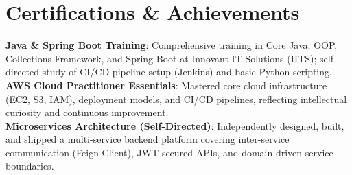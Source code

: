 \documentclass[letterpaper,10pt]{article}
\begin{document}
\section{Certifications \& Achievements}
 \begin{itemize}[leftmargin=0.15in, label={}]
    \small{\item{
     \textbf{Java \& Spring Boot Training}{: Comprehensive training in Core Java, OOP, Collections Framework, and Spring Boot at Innovant IT Solutions (IITS); self-directed study of CI/CD pipeline setup (Jenkins) and basic Python scripting.} \\
     \textbf{AWS Cloud Practitioner Essentials}{: Mastered core cloud infrastructure (EC2, S3, IAM), deployment models, and CI/CD pipelines, reflecting intellectual curiosity and continuous improvement.} \\
     \textbf{Microservices Architecture (Self-Directed)}{: Independently designed, built, and shipped a multi-service backend platform covering inter-service communication (Feign Client), JWT-secured APIs, and domain-driven service boundaries.}
    }}
 \end{itemize}
\end{document}
